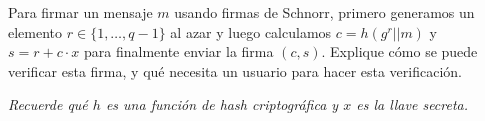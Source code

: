 Para firmar un mensaje $m$ usando firmas de Schnorr, primero generamos un elemento $r\in\{1,\ldots,q-1\}$ al azar y luego calculamos $c=h(g^r||m)$ y $s=r+c\cdot x$ para finalmente enviar la firma $(c, s)$.  Explique cómo se puede verificar esta firma, y qué necesita un usuario para hacer esta verificación.

\emph{Recuerde qué $h$ es una función de hash criptográfica y $x$ es la llave secreta.}
